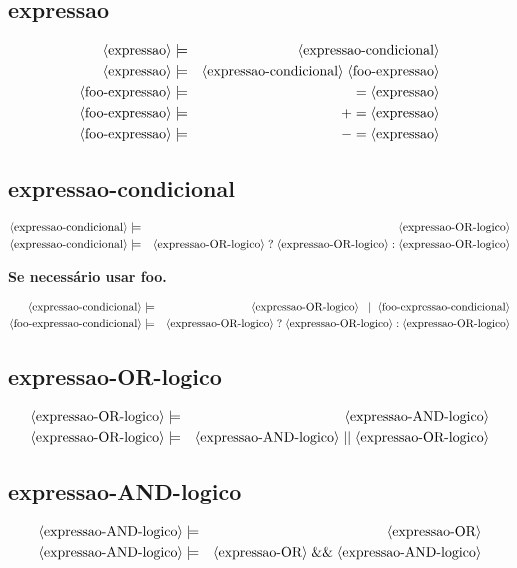 \documentclass[12pt,a4papper]{article}
\newcommand{\pn}[1]{\langle \textnormal{#1} \rangle}
\newcommand{\pp}{\models}
\newcommand{\oo}{\; \mid \;}
\newcommand{\ww}{\;}
\newcommand{\sm}[1]{\textnormal{#1}}
\begin{document}
\begin{landscape}
\subsection{expressao}
\begin{eqnarray}
\pn{expressao} &\pp& \pn{expressao-condicional} \\
\pn{expressao} &\pp& \pn{expressao-condicional} \ww \pn{foo-expressao} \\
          \pn{foo-expressao} &\pp& \sm{$=$} \ww \pn{expressao} \\
          \pn{foo-expressao} &\pp& \sm{$+=$} \ww \pn{expressao} \\
          \pn{foo-expressao} &\pp& \sm{$-=$} \ww \pn{expressao} \\
\end{eqnarray}


\subsection{expressao-condicional}
\begin{eqnarray}
\pn{expressao-condicional} &\pp& \pn{expressao-OR-logico} \\
\pn{expressao-condicional} &\pp& \pn{expressao-OR-logico} \ww \sm{?} \ww \pn{expressao-OR-logico} \ww \sm{:} \ww \pn{expressao-OR-logico}
\end{eqnarray}

\textbf{Se necessário usar foo.}

\begin{eqnarray}
\pn{expressao-condicional} &\pp& \pn{expressao-OR-logico} \ww \oo \pn{foo-expressao-condicional}  \\
\pn{foo-expressao-condicional} &\pp& \pn{expressao-OR-logico} \ww \sm{?} \ww \pn{expressao-OR-logico} \ww \sm{:} \ww \pn{expressao-OR-logico}
\end{eqnarray}



\subsection{expressao-OR-logico}
\begin{eqnarray}
\pn{expressao-OR-logico} &\pp& \pn{expressao-AND-logico} \\
\pn{expressao-OR-logico} &\pp& \pn{expressao-AND-logico} \ww  \sm{$\mid\mid$} \ww \pn{expressao-OR-logico} 
\end{eqnarray}


\subsection{expressao-AND-logico}
\begin{eqnarray}
\pn{expressao-AND-logico} &\pp& \pn{expressao-OR} \\
\pn{expressao-AND-logico} &\pp& \pn{expressao-OR} \ww \sm{\&\&} \ww \pn{expressao-AND-logico} 
\end{eqnarray}



\end{landscape}
\end{document}

